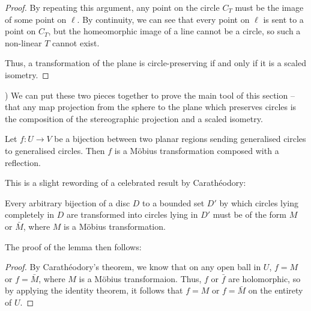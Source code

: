 {\begin{proof}
  By repeating this argument, any point on the circle $C_T$ must be
  the image of some point on $\ell$.  By continuity, we can see that
  every point on $\ell$ is sent to a point on $C_T$, but the
  homeomorphic image of a line cannot be a circle, so such
  a non-linear $T$ cannot exist.

  Thus, a transformation of the plane is circle-preserving if and only
  if it is a scaled isometry.
\end{proof}
)
We can put these two pieces together to prove the main tool of this
section -- that any map projection from the sphere to the plane which
preserves circles is the composition of the stereographic projection
and a scaled isometry.
}
\begin{lemma}
  Let $f:U\to V$ be a bijection between two planar regions 
  sending generalised circles to generalised circles. 
  Then $f$ is a M\"{o}bius transformation composed with a 
  reflection.
\end{lemma}
This is a slight rewording of a celebrated result by 
Carath\'{e}odory\cite{caratheodory}:
\begin{theorem}
Every arbitrary bijection of a disc $D$ to a bounded set $D'$ by which
circles lying completely in $D$ are transformed into circles 
lying in $D'$ must be of the form $M$ or $\bar M$, where $M$ is a 
M\"{o}bius transformation.
\end{theorem}
The proof of the lemma then follows:
\begin{proof}
  By Carath\'{e}odory's theorem, we know that on any open 
  ball in $U$, $f=M$ or $f=\bar M$, where 
  $M$ is a M\"{o}bius transformaion. Thus, $f$ or $\bar f$ 
  are holomorphic, so by applying the identity theorem, 
  it follows that $f = M$ or $f = \bar M$ on the entirety of 
  $U$.
\end{proof}

